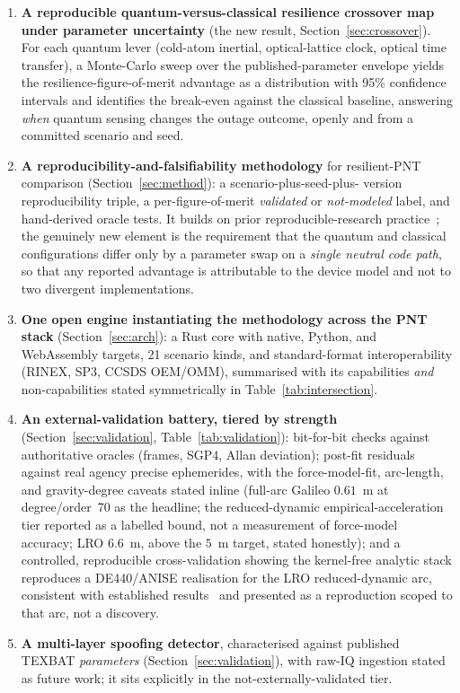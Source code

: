 \begin{enumerate}
  \item \textbf{A reproducible quantum-versus-classical resilience crossover map
  under parameter uncertainty} (the new result, Section~\ref{sec:crossover}).
  For each quantum lever (cold-atom inertial, optical-lattice clock, optical
  time transfer), a Monte-Carlo sweep over the published-parameter envelope
  yields the resilience-figure-of-merit advantage as a distribution with 95\%
  confidence intervals and identifies the break-even against the classical
  baseline, answering \emph{when} quantum sensing changes the outage outcome,
  openly and from a committed scenario and seed.

  \item \textbf{A reproducibility-and-falsifiability methodology} for
  resilient-PNT comparison (Section~\ref{sec:method}): a scenario-plus-seed-plus-
  version reproducibility triple, a per-figure-of-merit \emph{validated} or
  \emph{not-modeled} label, and hand-derived oracle tests. It builds on prior
  reproducible-research practice~\citep{fernandezprades2018reproducibility,nasastd7009};
  the genuinely new element is the requirement that the quantum and classical
  configurations differ only by a parameter swap on a \emph{single neutral code
  path}, so that any reported advantage is attributable to the device model and
  not to two divergent implementations.

  \item \textbf{One open engine instantiating the methodology across the PNT
  stack} (Section~\ref{sec:arch}): a Rust core with native, Python, and
  WebAssembly targets, 21 scenario kinds, and standard-format interoperability
  (RINEX, SP3, CCSDS OEM/OMM), summarised with its capabilities \emph{and}
  non-capabilities stated symmetrically in Table~\ref{tab:intersection}.

  \item \textbf{An external-validation battery, tiered by strength}
  (Section~\ref{sec:validation}, Table~\ref{tab:validation}): bit-for-bit checks
  against authoritative oracles (frames, SGP4, Allan deviation); post-fit
  residuals against real agency precise ephemerides, with the force-model-fit,
  arc-length, and gravity-degree caveats stated inline (full-arc Galileo
  $0.61$~m at degree/order~70 as the headline; the reduced-dynamic
  empirical-acceleration tier reported as a labelled bound, not a measurement of
  force-model accuracy; LRO $6.6$~m, above the $5$~m target, stated honestly);
  and a controlled, reproducible cross-validation showing the kernel-free
  analytic stack reproduces a DE440/ANISE realisation for the LRO reduced-dynamic
  arc, consistent with established results~\citep{bertone2021grail,li2023leopod}
  and presented as a reproduction scoped to that arc, not a discovery.

  \item \textbf{A multi-layer spoofing detector}, characterised against published
  TEXBAT \emph{parameters} (Section~\ref{sec:validation}), with raw-IQ ingestion
  stated as future work; it sits explicitly in the not-externally-validated tier.
\end{enumerate}


